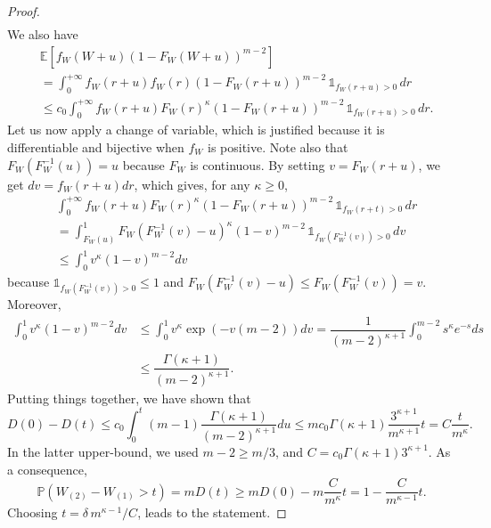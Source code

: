 \documentclass[paper=a4, fontsize=11pt]{scrartcl}
\newcommand{\ind}{\mathds{1}}
\newcommand{\PP}{\mathbb{P}}
\begin{document}
\begin{proof}
\begin{align*}
\end{align*}
We also have
\begin{align*}
      & \mathbb{E}[f_W(W+u)(1- F_W ( W + u ))^{m-2}] \\ &=   \int_0^{+\infty} f_W(r+u)f_W(r)(1- F_W ( r + u ))^{m-2} \, \ind_{f_W(r+u) > 0} \, dr \\
    & \leq  c_0 \int_0^{+\infty} f_W(r+u)  F_W(r)^\kappa (1- F_W ( r + u ))^{m-2} \, \ind_{f_W(r+u) > 0} \, dr.
\end{align*}
Let us now apply a change of variable, which is justified because it is differentiable and bijective when $f_W$ is positive. Note also that $ F _W ( F_W^{-1} (u)) = u$ because $F_W$ is continuous. By setting $v=F_W(r+u)$, we get $dv=f_W(r+u)dr$, which gives, for any $\kappa \geq 0$,
\begin{align*}
    &\int_0^{+\infty} f_W(r+u)  F_W(r)^\kappa (1- F_W ( r + u ))^{m-2}\, \ind_{f_W(r+t) > 0} \, dr \\ &= \int_{F_W(u)}^{1}  F_W(F_W^{-1}(v)-u)^\kappa (1- v)^{m-2} \, \ind_{f_W(F^{-1}_W(v)) > 0} \, dv \\ &\leq  \int_{0}^{1} v^\kappa (1- v)^{m-2}dv 
\end{align*}
because $\ind_{f_W(F^{-1}_W(v)) > 0} \leq 1$ and $ F_W(F_W^{-1}(v)-u) \leq F_W(F_W^{-1}(v)) = v.$
Moreover,
\begin{align*}
\int_{0}^{1} v^\kappa (1- v)^{m-2}dv &\leq \int_{0}^{1} v^\kappa \exp(-v(m-2)) dv = \dfrac{1}{(m-2)^{\kappa+1}}\int_{0}^{m-2} s^\kappa e^{-s} ds \\ &\leq \dfrac{\Gamma(\kappa+1)}{(m-2)^{\kappa+1}}.
\end{align*}
Putting things together, we have shown that
$$D(0) - D(t) \leq c_0 \int_{0}^t (m-1)  \dfrac{\Gamma(\kappa+1)}{(m-2)^{\kappa+1}} du \leq m c_0 \Gamma(\kappa+1) \dfrac{3^{\kappa+1}}{m^{\kappa+1}} t = C \dfrac{t}{m^\kappa}.$$
In the latter upper-bound, we used $m-2 \geq m/3$, and $C = c_0 \Gamma(\kappa+1) 3^{\kappa+1}$. As a consequence, $$\PP\left(W_{(2)} -W_{(1)}   > t \right) = m D(t) \geq m D(0) - m \dfrac{C}{m^\kappa} t =   1 - \dfrac{C}{m^{\kappa-1}} t.$$
Choosing $t = { \delta  \, m^{\kappa-1}} / {C}$, leads to the statement.
\end{proof}

\end{document}
